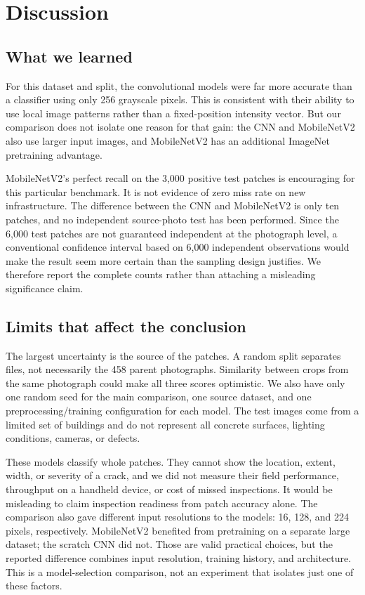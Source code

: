 \documentclass[conference,letterpaper]{IEEEtran}
\begin{document}
\section{Discussion}
\subsection{What we learned}
For this dataset and split, the convolutional models were far more accurate than a classifier using only 256 grayscale pixels. This is consistent with their ability to use local image patterns rather than a fixed-position intensity vector. But our comparison does not isolate one reason for that gain: the CNN and MobileNetV2 also use larger input images, and MobileNetV2 has an additional ImageNet pretraining advantage.

MobileNetV2's perfect recall on the 3,000 positive test patches is encouraging for this particular benchmark. It is not evidence of zero miss rate on new infrastructure. The difference between the CNN and MobileNetV2 is only ten patches, and no independent source-photo test has been performed. Since the 6,000 test patches are not guaranteed independent at the photograph level, a conventional confidence interval based on 6,000 independent observations would make the result seem more certain than the sampling design justifies. We therefore report the complete counts rather than attaching a misleading significance claim.

\subsection{Limits that affect the conclusion}
The largest uncertainty is the source of the patches. A random split separates files, not necessarily the 458 parent photographs. Similarity between crops from the same photograph could make all three scores optimistic. We also have only one random seed for the main comparison, one source dataset, and one preprocessing/training configuration for each model. The test images come from a limited set of buildings and do not represent all concrete surfaces, lighting conditions, cameras, or defects.

These models classify whole patches. They cannot show the location, extent, width, or severity of a crack, and we did not measure their field performance, throughput on a handheld device, or cost of missed inspections. It would be misleading to claim inspection readiness from patch accuracy alone. The comparison also gave different input resolutions to the models: 16, 128, and 224 pixels, respectively. MobileNetV2 benefited from pretraining on a separate large dataset; the scratch CNN did not. Those are valid practical choices, but the reported difference combines input resolution, training history, and architecture. This is a model-selection comparison, not an experiment that isolates just one of these factors.
\end{document}
